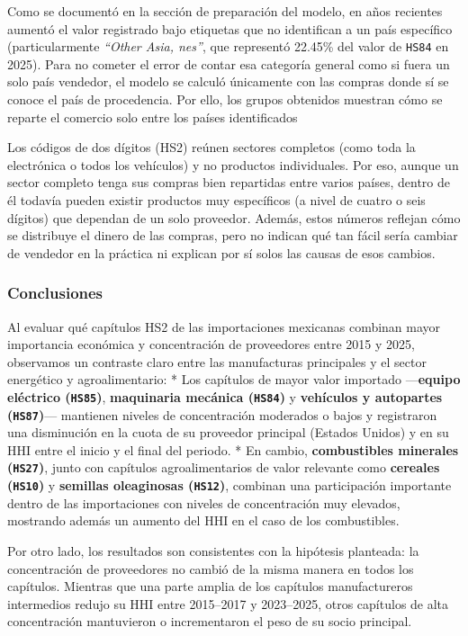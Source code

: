 \documentclass[
]{article}
\begin{document}
Como se documentó en la sección de preparación del modelo, en años
recientes aumentó el valor registrado bajo etiquetas que no identifican
a un país específico (particularmente \emph{``Other Asia, nes''}, que
representó 22.45\% del valor de \texttt{HS84} en 2025). Para no cometer
el error de contar esa categoría general como si fuera un solo país
vendedor, el modelo se calculó únicamente con las compras donde sí se
conoce el país de procedencia. Por ello, los grupos obtenidos muestran
cómo se reparte el comercio solo entre los países identificados

Los códigos de dos dígitos (HS2) reúnen sectores completos (como toda la
electrónica o todos los vehículos) y no productos individuales. Por eso,
aunque un sector completo tenga sus compras bien repartidas entre varios
países, dentro de él todavía pueden existir productos muy específicos (a
nivel de cuatro o seis dígitos) que dependan de un solo proveedor.
Además, estos números reflejan cómo se distribuye el dinero de las
compras, pero no indican qué tan fácil sería cambiar de vendedor en la
práctica ni explican por sí solos las causas de esos cambios.

\subsubsection{Conclusiones}\label{conclusiones}

Al evaluar qué capítulos HS2 de las importaciones mexicanas combinan
mayor importancia económica y concentración de proveedores entre 2015 y
2025, observamos un contraste claro entre las manufacturas principales y
el sector energético y agroalimentario: * Los capítulos de mayor valor
importado ---\textbf{equipo eléctrico (\texttt{HS85})},
\textbf{maquinaria mecánica (\texttt{HS84})} y \textbf{vehículos y
autopartes (\texttt{HS87})}--- mantienen niveles de concentración
moderados o bajos y registraron una disminución en la cuota de su
proveedor principal (Estados Unidos) y en su HHI entre el inicio y el
final del periodo. * En cambio, \textbf{combustibles minerales
(\texttt{HS27})}, junto con capítulos agroalimentarios de valor
relevante como \textbf{cereales (\texttt{HS10})} y \textbf{semillas
oleaginosas (\texttt{HS12})}, combinan una participación importante
dentro de las importaciones con niveles de concentración muy elevados,
mostrando además un aumento del HHI en el caso de los combustibles.

Por otro lado, los resultados son consistentes con la hipótesis
planteada: la concentración de proveedores no cambió de la misma manera
en todos los capítulos. Mientras que una parte amplia de los capítulos
manufactureros intermedios redujo su HHI entre 2015--2017 y 2023--2025,
otros capítulos de alta concentración mantuvieron o incrementaron el
peso de su socio principal.
\end{document}
